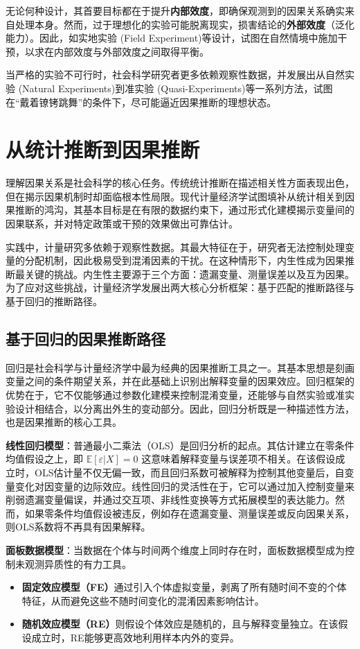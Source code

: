 无论何种设计，其首要目标都在于提升\textbf{内部效度}，即确保观测到的因果关系确实来自处理本身。然而，过于理想化的实验可能脱离现实，损害结论的\textbf{外部效度}（泛化能力）。因此，如实地实验 (Field Experiment)等设计，试图在自然情境中施加干预，以求在内部效度与外部效度之间取得平衡。

当严格的实验不可行时，社会科学研究者更多依赖观察性数据，并发展出从自然实验 (Natural Experiments)到准实验 (Quasi-Experiments)等一系列方法，试图在“戴着镣铐跳舞”的条件下，尽可能逼近因果推断的理想状态。

\section{从统计推断到因果推断}

理解因果关系是社会科学的核心任务。传统统计推断在描述相关性方面表现出色，但在揭示因果机制时却面临根本性局限。现代计量经济学试图填补从统计相关到因果推断的鸿沟，其基本目标是在有限的数据约束下，通过形式化建模揭示变量间的因果联系，并对特定政策或干预的效果做出可靠估计。

实践中，计量研究多依赖于观察性数据。其最大特征在于，研究者无法控制处理变量的分配机制，因此极易受到混淆因素的干扰。在这种情形下，内生性成为因果推断最关键的挑战。内生性主要源于三个方面：遗漏变量、测量误差以及互为因果。为了应对这些挑战，计量经济学发展出两大核心分析框架：基于匹配的推断路径与基于回归的推断路径。

\subsection{基于回归的因果推断路径}

回归是社会科学与计量经济学中最为经典的因果推断工具之一。其基本思想是刻画变量之间的条件期望关系，并在此基础上识别出解释变量的因果效应。回归框架的优势在于，它不仅能够通过参数化建模来控制混淆变量，还能够与自然实验或准实验设计相结合，以分离出外生的变动部分。因此，回归分析既是一种描述性方法，也是因果推断的核心工具。

\textbf{线性回归模型}：普通最小二乘法（OLS）是回归分析的起点。其估计建立在零条件均值假设之上，即 $\mathbb{E}[\varepsilon|X]=0$ 这意味着解释变量与误差项不相关。在该假设成立时，OLS估计量不仅无偏一致，而且回归系数可被解释为控制其他变量后，自变量变化对因变量的边际效应。线性回归的灵活性在于，它可以通过加入控制变量来削弱遗漏变量偏误，并通过交互项、非线性变换等方式拓展模型的表达能力。然而，如果零条件均值假设被违反，例如存在遗漏变量、测量误差或反向因果关系，则OLS系数将不再具有因果解释。

\textbf{面板数据模型}：当数据在个体与时间两个维度上同时存在时，面板数据模型成为控制未观测异质性的有力工具。  
\begin{itemize}
    \item \textbf{固定效应模型（FE）}通过引入个体虚拟变量，剥离了所有随时间不变的个体特征，从而避免这些不随时间变化的混淆因素影响估计。
    \item \textbf{随机效应模型（RE）}则假设个体效应是随机的，且与解释变量独立。在该假设成立时，RE能够更高效地利用样本内外的变异。
\end{itemize}


